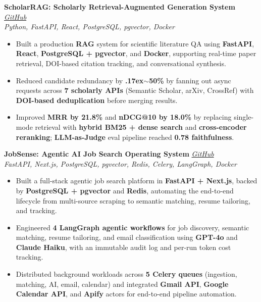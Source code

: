 \documentclass[letterpaper,10pt]{article}
\newcommand{\resumeProject}[3]{%
  \vspace{2pt}%
  \textbf{#1} \hfill \href{#3}{\textit{GitHub}} \\[-1pt]
  \textit{#2}%
  \vspace{1pt}%
}
\begin{document}
\resumeProject
  {ScholarRAG: Scholarly Retrieval-Augmented Generation System}
  {Python, FastAPI, React, PostgreSQL, pgvector, Docker}
  {https://github.com/sushildalavi/ScholarRAG-A-Retrieval-Augmented-LLM-Assistant-for-Research-Paper-Discovery-and-Synthesis}
\begin{itemize}
  \item Built a production \textbf{RAG} system for scientific literature QA using \textbf{FastAPI}, \textbf{React}, \textbf{PostgreSQL + pgvector}, and \textbf{Docker}, supporting real-time paper retrieval, DOI-based citation tracking, and conversational synthesis.
  \item Reduced candidate redundancy by \textbf{{\raise.17ex\hbox{$\scriptstyle\sim$}}50\%} by fanning out async requests across \textbf{7 scholarly APIs} (Semantic Scholar, arXiv, CrossRef) with \textbf{DOI-based deduplication} before merging results.
  \item Improved \textbf{MRR by 21.8\%} and \textbf{nDCG@10 by 18.0\%} by replacing single-mode retrieval with \textbf{hybrid BM25 + dense search} and \textbf{cross-encoder reranking}; \textbf{LLM-as-Judge} eval pipeline reached \textbf{0.78 faithfulness}.
\end{itemize}

\vspace{2pt}

\resumeProject
  {JobSense: Agentic AI Job Search Operating System}
  {FastAPI, Next.js, PostgreSQL, pgvector, Redis, Celery, LangGraph, Docker}
  {https://github.com/sushildalavi/JobSense}
\begin{itemize}
  \item Built a full-stack agentic job search platform in \textbf{FastAPI + Next.js}, backed by \textbf{PostgreSQL + pgvector} and \textbf{Redis}, automating the end-to-end lifecycle from multi-source scraping to semantic matching, resume tailoring, and tracking.
  \item Engineered \textbf{4 LangGraph agentic workflows} for job discovery, semantic matching, resume tailoring, and email classification using \textbf{GPT-4o} and \textbf{Claude Haiku}, with an immutable audit log and per-run token cost tracking.
  \item Distributed background workloads across \textbf{5 Celery queues} (ingestion, matching, AI, email, calendar) and integrated \textbf{Gmail API}, \textbf{Google Calendar API}, and \textbf{Apify} actors for end-to-end pipeline automation.
\end{itemize}
\end{document}
